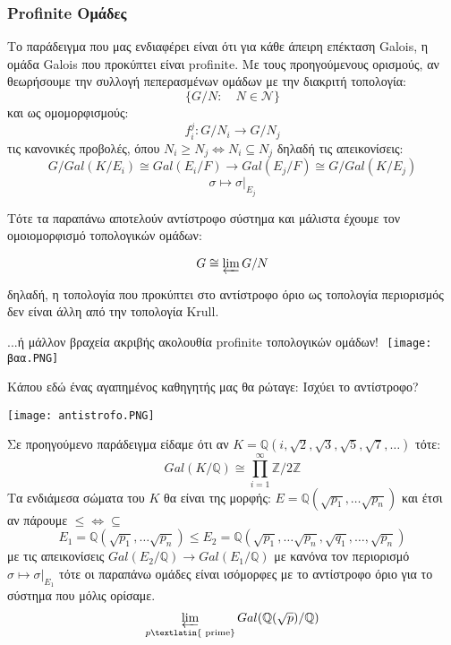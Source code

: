 \documentclass{beamer}
\newcommand {\tl}{\textlatin}
\begin{document}
\begin{frame}
    \frametitle{\tl{Profinite} Ομάδες}
    Το παράδειγμα που μας ενδιαφέρει είναι ότι για κάθε άπειρη επέκταση \tl{Galois}, η ομάδα \tl{Galois} που προκύπτει είναι \tl{profinite}. Με τους προηγούμενους ορισμούς, αν θεωρήσουμε την συλλογή πεπερασμένων ομάδων με την διακριτή τοπολογία:
$$\{G/N: \quad N \in \mathcal{N}\}$$
και ως ομομορφισμούς:
$$f^j_i : G/N_i \longrightarrow G/N_j$$
τις κανονικές προβολές, όπου $N_i \geq N_j \iff N_i \subseteq N_j$
δηλαδή τις απεικονίσεις:
$$G/Gal(K/E_i) \cong Gal(E_i /F) \longrightarrow Gal(E_j /F) \cong G/Gal(K/E_j)$$
$$\sigma \longmapsto \sigma|_{E_j}$$
\end{frame}

\begin{frame}
Τότε τα παραπάνω αποτελούν αντίστροφο σύστημα και μάλιστα έχουμε τον ομοιομορφισμό τοπολογικών ομάδων:

$$G \cong \varprojlim G/N$$

\noindent δηλαδή, η τοπολογία που προκύπτει στο αντίστροφο όριο ως τοπολογία περιορισμός δεν είναι άλλη από την τοπολογία \tl{Krull}.
\end{frame}




\begin{frame}
...ή μάλλον βραχεία ακριβής ακολουθία \tl{profinite} τοπολογικών ομάδων!
     $ $\newline
    \texttt{[image: βαα.PNG]}
\end{frame}

\begin{frame}
    \begin{block}{Κάπου εδώ ένας αγαπημένος καθηγητής μας θα ρώταγε:}
    Ισχύει το αντίστροφο?
    \end{block}
    \pause
    
    \texttt{[image: antistrofo.PNG]}
\end{frame}


\begin{frame}
    Σε προηγούμενο παράδειγμα είδαμε ότι αν $K = \mathbb Q (i, \sqrt 2 , \sqrt 3 , \sqrt 5 , \sqrt 7 , \ldots)$ τότε:
	$$Gal(K/\mathbb{Q}) \cong \prod \limits_{i=1}^{\infty} \mathbb Z / 2 \mathbb Z$$
	Τα ενδιάμεσα σώματα του $K$ θα είναι της μορφής: $E = \mathbb{Q} (\sqrt{p_1},\ldots \sqrt{p_n})$ και έτσι αν πάρουμε $\leq \iff \subseteq$
	$$E_1 = \mathbb{Q} (\sqrt{p_1},\ldots \sqrt{p_n}) \leq  E_2 = \mathbb{Q} (\sqrt{p_1},\ldots \sqrt{p_n},\sqrt{q_1},\ldots ,\sqrt{p_n})$$
	με τις απεικονίσεις $Gal(E_2/ \mathbb{Q}) \rightarrow Gal(E_1 / \mathbb{Q})$ με κανόνα τον περιορισμό $\sigma \mapsto \sigma|_{E_1}$ τότε οι παραπάνω ομάδες είναι ισόμορφες με το αντίστροφο όριο για το σύστημα που μόλις ορίσαμε.
	$$\varprojlim\limits_{p \text{\tl{ prime}}} Gal(\mathbb{Q}(\sqrt{p}) / \mathbb{Q})$$
\end{frame}
\end{document}
